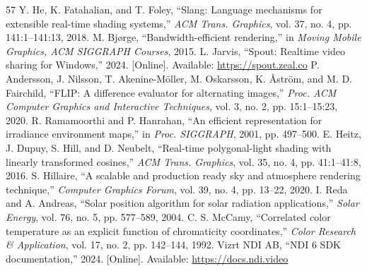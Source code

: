 \documentclass[conference]{IEEEtran}
\begin{document}
\begin{thebibliography}{57}
 Y. He, K. Fatahalian, and T. Foley, ``Slang: Language mechanisms for extensible real-time shading systems,'' \textit{ACM Trans. Graphics}, vol. 37, no. 4, pp. 141:1--141:13, 2018.
 M. Bjørge, ``Bandwidth-efficient rendering,'' in \textit{Moving Mobile Graphics, ACM SIGGRAPH Courses}, 2015.
 L. Jarvis, ``Spout: Realtime video sharing for Windows,'' 2024. [Online]. Available: \url{https://spout.zeal.co}
 P. Andersson, J. Nilsson, T. Akenine-Möller, M. Oskarsson, K. Åström, and M. D. Fairchild, ``FLIP: A difference evaluator for alternating images,'' \textit{Proc. ACM Computer Graphics and Interactive Techniques}, vol. 3, no. 2, pp. 15:1--15:23, 2020.
 R. Ramamoorthi and P. Hanrahan, ``An efficient representation for irradiance environment maps,'' in \textit{Proc. SIGGRAPH}, 2001, pp. 497--500.
 E. Heitz, J. Dupuy, S. Hill, and D. Neubelt, ``Real-time polygonal-light shading with linearly transformed cosines,'' \textit{ACM Trans. Graphics}, vol. 35, no. 4, pp. 41:1--41:8, 2016.
 S. Hillaire, ``A scalable and production ready sky and atmosphere rendering technique,'' \textit{Computer Graphics Forum}, vol. 39, no. 4, pp. 13--22, 2020.
 I. Reda and A. Andreas, ``Solar position algorithm for solar radiation applications,'' \textit{Solar Energy}, vol. 76, no. 5, pp. 577--589, 2004.
 C. S. McCamy, ``Correlated color temperature as an explicit function of chromaticity coordinates,'' \textit{Color Research \& Application}, vol. 17, no. 2, pp. 142--144, 1992.
 Vizrt NDI AB, ``NDI 6 SDK documentation,'' 2024. [Online]. Available: \url{https://docs.ndi.video}
\end{thebibliography}
\end{document}
